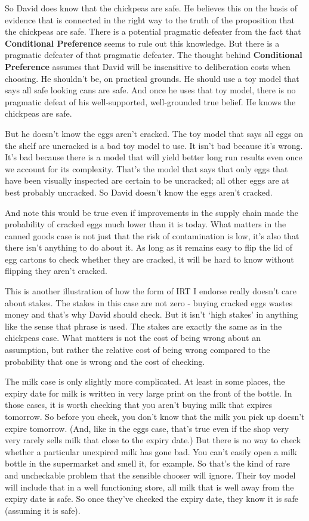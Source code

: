 \documentclass[
  11pt,
]{book}
\begin{document}
So David does know that the chickpeas are safe. He believes this on the basis of evidence that is connected in the right way to the truth of the proposition that the chickpeas are safe. There is a potential pragmatic defeater from the fact that \textbf{Conditional Preference} seems to rule out this knowledge. But there is a pragmatic defeater of that pragmatic defeater. The thought behind \textbf{Conditional Preference} assumes that David will be insensitive to deliberation costs when choosing. He shouldn't be, on practical grounds. He should use a toy model that says all safe looking cans are safe. And once he uses that toy model, there is no pragmatic defeat of his well-supported, well-grounded true belief. He knows the chickpeas are safe.

But he doesn't know the eggs aren't cracked. The toy model that says all eggs on the shelf are uncracked is a bad toy model to use. It isn't bad because it's wrong. It's bad because there is a model that will yield better long run results even once we account for its complexity. That's the model that says that only eggs that have been visually inspected are certain to be uncracked; all other eggs are at best probably uncracked. So David doesn't know the eggs aren't cracked.

And note this would be true even if improvements in the supply chain made the probability of cracked eggs much lower than it is today. What matters in the canned goods case is not just that the risk of contamination is low, it's also that there isn't anything to do about it. As long as it remains easy to flip the lid of egg cartons to check whether they are cracked, it will be hard to know without flipping they aren't cracked.

This is another illustration of how the form of IRT I endorse really doesn't care about stakes. The stakes in this case are not zero - buying cracked eggs wastes money and that's why David should check. But it isn't `high stakes' in anything like the sense that phrase is used. The stakes are exactly the same as in the chickpeas case. What matters is not the cost of being wrong about an assumption, but rather the relative cost of being wrong compared to the probability that one is wrong and the cost of checking.

The milk case is only slightly more complicated. At least in some places, the expiry date for milk is written in very large print on the front of the bottle. In those cases, it is worth checking that you aren't buying milk that expires tomorrow. So before you check, you don't know that the milk you pick up doesn't expire tomorrow. (And, like in the eggs case, that's true even if the shop very very rarely sells milk that close to the expiry date.) But there is no way to check whether a particular unexpired milk has gone bad. You can't easily open a milk bottle in the supermarket and smell it, for example. So that's the kind of rare and uncheckable problem that the sensible chooser will ignore. Their toy model will include that in a well functioning store, all milk that is well away from the expiry date is safe. So once they've checked the expiry date, they know it is safe (assuming it is safe).
\end{document}

